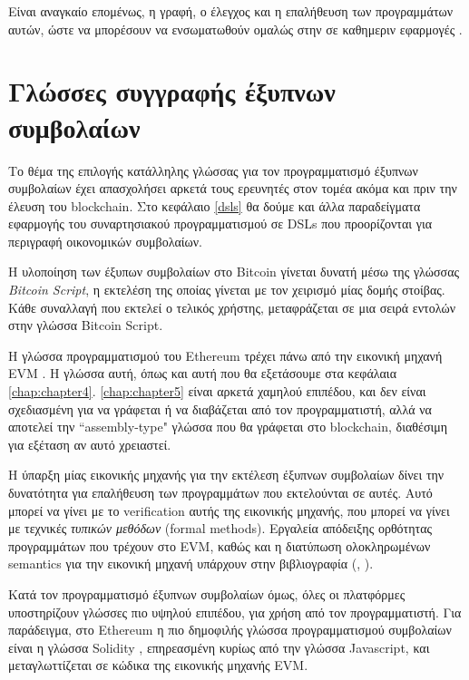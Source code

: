 Είναι αναγκαίο επομένως, η γραφή, ο έλεγχος και η επαλήθευση των προγραμμάτων αυτών, ώστε να
μπορέσουν να ενσωματωθούν ομαλώς στην σε καθημεριν εφαρμογές .


\section{Γλώσσες συγγραφής έξυπνων συμβολαίων}


Το θέμα της επιλογής κατάλληλης γλώσσας για τον προγραμματισμό έξυπνων συμβολαίων έχει  απασχολήσει
 αρκετά τους ερευνητές στον τομέα ακόμα και πριν την έλευση του blockchain. Στο κεφάλαιο \ref{dsls} θα
   δούμε και άλλα παραδείγματα εφαρμογής του συναρτησιακού προγραμματισμού σε DSLs που προορίζονται
   για περιγραφή οικονομικών συμβολαίων.



              Η υλοποίηση των έξυπων συμβολαίων στο Bitcoin γίνεται δυνατή μέσω της γλώσσας
              \textit{Bitcoin Script}, η εκτελέση της οποίας γίνεται με τον χειρισμό μίας δομής στοίβας. Κάθε
              συναλλαγή που εκτελεί ο τελικός χρήστης, μεταφράζεται σε μια σειρά εντολών στην γλώσσα
              Bitcoin Script.


Η γλώσσα προγραμματισμού του Ethereum τρέχει πάνω από την εικονική μηχανή  EVM \cite{ethereum}. Η
γλώσσα αυτή, όπως και αυτή που θα εξετάσουμε στα κεφάλαια \ref{chap:chapter4}. \ref{chap:chapter5} είναι
αρκετά χαμηλού επιπέδου, και δεν είναι σχεδιασμένη για να γράφεται ή να διαβάζεται από τον προγραμματιστή,
αλλά να αποτελεί την ``assembly-type" γλώσσα που θα γράφεται στο blockchain, διαθέσιμη
για εξέταση αν αυτό χρειαστεί.

Η ύπαρξη μίας εικονικής μηχανής για την εκτέλεση έξυπνων συμβολαίων δίνει την δυνατότητα για
επαλήθευση των προγραμμάτων που εκτελούνται σε αυτές. Αυτό μπορεί να γίνει με το verification αυτής
της εικονικής μηχανής, που μπορεί να γίνει με τεχνικές \emph{τυπικών μεθόδων} (formal methods). Εργαλεία
απόδειξης ορθότητας προγραμμάτων που τρέχουν στο EVM, καθώς και η διατύπωση ολοκληρωμένων
semantics για την εικονική μηχανή υπάρχουν στην βιβλιογραφία (\cite{evmverification}, \cite{kevmverification}).

Κατά τον προγραμματισμό έξυπνων συμβολαίων όμως, όλες οι πλατφόρμες υποστηρίζουν γλώσσες πιο
υψηλού επιπέδου, για χρήση από τον προγραμματιστή. Για παράδειγμα, στο Ethereum η πιο δημοφιλής
γλώσσα προγραμματισμού συμβολαίων είναι η γλώσσα Solidity \cite{solidity}, επηρεασμένη κυρίως από
την γλώσσα Javascript, και μεταγλωττίζεται σε κώδικα της εικονικής μηχανής EVM.

